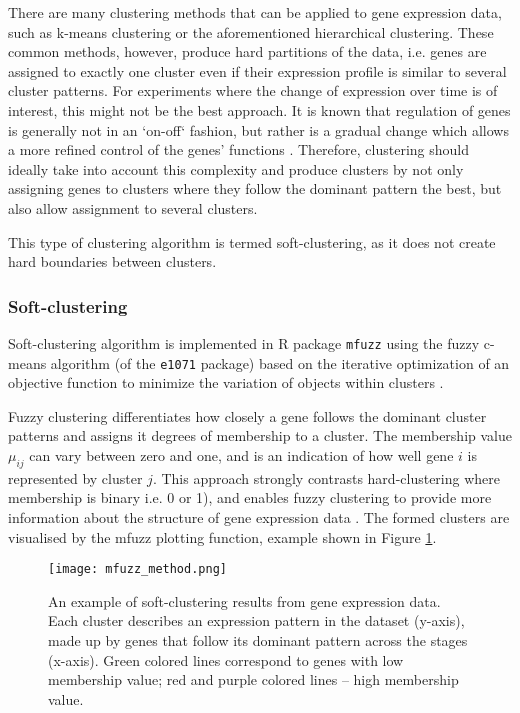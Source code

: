 There are many clustering methods that can be applied to gene expression data, such as k-means clustering or the aforementioned hierarchical clustering. These common methods, however, produce hard partitions of the data, i.e. genes are assigned to exactly one cluster even if their expression profile is similar to several cluster patterns. For experiments where the change of expression over time is of interest, this might not be the best approach. It is known that regulation of genes is generally not in an `on-off` fashion, but rather is a gradual change which allows a more refined control of the genes' functions  \cite{Kumar2007Mfuzz:Data}. Therefore, clustering should ideally take into account this complexity and produce clusters by not only assigning genes to clusters where they follow the dominant pattern the best, but also allow assignment to several clusters.
 
This type of clustering algorithm is termed soft-clustering, as it does not  create hard boundaries between clusters. 
 
\subsubsection{Soft-clustering}
 
Soft-clustering algorithm is implemented in R package \texttt{mfuzz} \cite{Kumar2007Mfuzz:Data}  using the fuzzy c-means algorithm (of the \texttt{e1071} package) based on the iterative optimization of an
objective function to minimize the variation of objects within clusters  \cite{Bezdek1981PatternAlgorithms}.
 
Fuzzy clustering differentiates how closely a gene follows the dominant cluster patterns and assigns it degrees of membership to a cluster. The membership value $\mu_{ij}$ can vary between zero and one, and is an indication of how well gene $i$ is represented by cluster $j$. This approach strongly contrasts hard-clustering where membership is binary i.e. 0 or 1), and enables fuzzy clustering to provide more information about the structure of gene expression data \cite{Kumar2007Mfuzz:Data}. 
The formed clusters are visualised by the mfuzz plotting function, example shown in Figure \ref{fig:mfuzzmethod}. 

            \begin{figure}[h]
            \centering
            \texttt{[image: mfuzz\_method.png]}
            \caption{An example of soft-clustering results from gene expression data. Each cluster describes an expression pattern in the dataset (y-axis), made up by genes that follow its dominant pattern across the stages (x-axis).  Green colored lines correspond to genes with low membership value; red and purple colored lines -- high membership value.              
            }
            \label{fig:mfuzzmethod}
            \end{figure}
            
